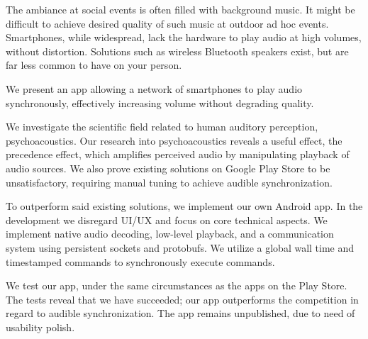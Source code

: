 The ambiance at social events is often filled with background music.
It might be difficult to achieve desired quality of such music at outdoor ad hoc events.
Smartphones, while widespread, lack the hardware to play audio at high volumes, without distortion.
Solutions such as wireless Bluetooth speakers exist, but are far less common to have on your person.

We present an app allowing a network of smartphones to play audio synchronously, effectively increasing volume without degrading quality.

We investigate the scientific field related to human auditory perception, psychoacoustics.
Our research into psychoacoustics reveals a useful effect, the precedence effect, which amplifies perceived audio by manipulating playback of audio sources.
We also prove existing solutions on Google Play Store to be unsatisfactory, requiring manual tuning to achieve audible synchronization.

To outperform said existing solutions, we implement our own Android app.
In the development we disregard UI/UX and focus on core technical aspects.
We implement native audio decoding, low-level playback, and a communication system using persistent sockets and protobufs.
We utilize a global wall time and timestamped commands to synchronously execute commands.

We test our app, under the same circumstances as the apps on the Play Store.
The tests reveal that we have succeeded; our app outperforms the competition in regard to audible synchronization.
The app remains unpublished, due to need of usability polish.
